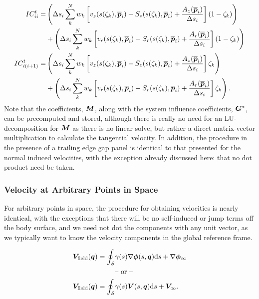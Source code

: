 \begin{equation}
    \begin{aligned}
        IC^t_{ii} =& \left(\Delta s_i\sum_k^N  w_k \left[v_z(s(\zeta_k),\overline{\bm{p}}_i)-S_z(s(\zeta_k),\overline{\bm{p}}_i)+\frac{A_z(\overline{\bm{p}}_i)}{\Delta s_i}\right] (1-\zeta_k)\right)  \\
            &+ \left(\Delta s_i\sum_k^N  w_k \left[v_r(s(\zeta_k),\overline{\bm{p}}_i)-S_r(s(\zeta_k),\overline{\bm{p}}_i)+\frac{A_r(\overline{\bm{p}}_i)}{\Delta s_i}\right] (1-\zeta_k) \right)  \\
        IC^t_{i(i+1)} =& \left(\Delta s_i\sum_k^N  w_k \left[v_z(s(\zeta_k),\overline{\bm{p}}_i)-S_z(s(\zeta_k),\overline{\bm{p}}_i)+\frac{A_z(\overline{\bm{p}}_i)}{\Delta s_i}\right] \zeta_k \right)  \\
            &+ \left(\Delta s_i\sum_k^N  w_k \left[v_r(s(\zeta_k),\overline{\bm{p}}_i)-S_r(s(\zeta_k),\overline{\bm{p}}_i)+\frac{A_r(\overline{\bm{p}}_i)}{\Delta s_i}\right] \zeta_k \right) .
    \end{aligned}
\end{equation}
%
Note that the coefficients, \(\bm{M}\), along with the system influence coefficients, \(\bm{G}^*\), can be precomputed and stored, although there is really no need for an LU-decomposition for \(\bm{M}\) as there is no linear solve, but rather a direct matrix-vector multiplication to calculate the tangential velocity.
%
In addition, the procedure in the presence of a trailing edge gap panel is identical to that presented for the normal induced velocities, with the exception already discussed here: that no dot product need be taken.

\subsubsection{Velocity at Arbitrary Points in Space}

For arbitrary points in space, the procedure for obtaining velocities is nearly identical, with the exceptions that there will be no self-induced or jump terms off the body surface, and we need not dot the components with any unit vector, as we typically want to know the velocity components in the global reference frame.

\begin{subequations}
    \label{eqn:fredholmarbitrary}
    \begin{align}
        \bm{V}_\text{field}(\bm{q}) = \oint_\mathcal{S}& \gamma(s) \nabla \bm{\phi}(s,\bm{q}) \mathrm{d} s  + \nabla \bm{\phi}_\infty \\
                                               & \text{-- or --} \notag\\
        \bm{V}_\text{field}(\bm{q}) = \oint_\mathcal{S} &\gamma(s) \bm{V}(s,\bm{q}) \mathrm{d} s + \bm{V}_\infty.
   \end{align}
\end{subequations}

